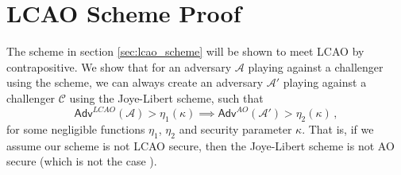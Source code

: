 \documentclass[10pt,letterpaper,oneside,twocolumn,journal]{IEEEtran}
\theoremstyle{definition}
\theoremstyle{definition}
\theoremstyle{remark}
\begin{document}
\section{LCAO Scheme Proof} \label{app:proof}
The scheme in section \ref{sec:lcao_scheme} will be shown to meet LCAO by contrapositive. We show that for an adversary $\mathcal{A}$ playing against a challenger using the scheme, we can always create an adversary $\mathcal{A}'$ playing against a challenger $\mathcal{C}$ using the Joye-Libert scheme, such that
\begin{equation*}
    \mathsf{Adv}^{LCAO}(\mathcal{A}) > \eta_1(\kappa) \implies \mathsf{Adv}^{AO}(\mathcal{A}') > \eta_2(\kappa)\,,
\end{equation*}
for some negligible functions $\eta_1$, $\eta_2$ and security parameter $\kappa$. That is, if we assume our scheme is not LCAO secure, then the Joye-Libert scheme is not AO secure (which is not the case \cite{joyeScalableSchemePrivacyPreserving2013}).
\end{document}
